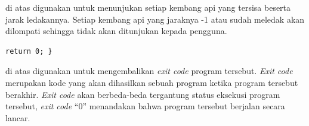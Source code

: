 \documentclass{subfiles}
\begin{document}
{\Script} di atas digunakan untuk menunjukan setiap kembang api yang tersisa beserta jarak ledakannya. Setiap kembang api yang jaraknya -1 atau sudah meledak akan dilompati sehingga tidak akan ditunjukan kepada pengguna.

\begin{code}
\begin{verbatim}
return 0; }
\end{verbatim}
\end{code}

{\Script} di atas digunakan untuk mengembalikan \textit{exit code} program tersebut. \textit{Exit code} merupakan kode yang akan dihasilkan sebuah program ketika program tersebut berakhir. \textit{Exit code} akan berbeda-beda tergantung status eksekusi program tersebut, \textit{exit code} ``0'' menandakan bahwa program tersebut berjalan secara lancar.
\end{document}
